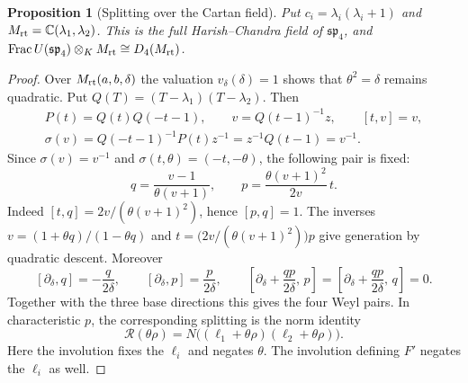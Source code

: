 \documentclass[11pt,a4paper]{article}
\newcommand{\C}{\mathbb C}
\newtheorem{proposition}[theorem]{Proposition}
\theoremstyle{definition}
\begin{document}
\begin{proposition}[Splitting over the Cartan field]\label{prop:cartansplit}
Put \(c_i=\lambda_i(\lambda_i+1)\) and \(M_{\rm rt}=\C(\lambda_1,\lambda_2)\). This is the full Harish--Chandra field of \(\mathfrak{sp}_4\), and \(\operatorname{Frac}U(\mathfrak{sp}_4)\otimes_K M_{\rm rt}\cong D_4(M_{\rm rt})\).
\end{proposition}
\begin{proof}
Over \(M_{\rm rt}(a,b,\delta)\) the valuation \(v_\delta(\delta)=1\) shows that \(\theta^2=\delta\) remains quadratic. Put \(Q(T)=(T-\lambda_1)(T-\lambda_2)\). Then
\[
 \begin{gathered}
 P(t)=Q(t)Q(-t-1),\qquad v=Q(t-1)^{-1}z,\qquad [t,v]=v,\\
 \sigma(v)=Q(-t-1)^{-1}P(t)z^{-1}=z^{-1}Q(t-1)=v^{-1}.
 \end{gathered}
\]
Since \(\sigma(v)=v^{-1}\) and \(\sigma(t,\theta)=(-t,-\theta)\), the following pair is fixed:
\[
 q=\frac{v-1}{\theta(v+1)},\qquad p=\frac{\theta(v+1)^2}{2v}\,t .
\]
Indeed \([t,q]=2v/(\theta(v+1)^2)\), hence \([p,q]=1\). The inverses \(v=(1+\theta q)/(1-\theta q)\) and \(t=\big(2v/(\theta(v+1)^2)\big)p\) give generation by quadratic descent. Moreover
\[
 [\partial_\delta,q]=-\frac{q}{2\delta},\qquad
 [\partial_\delta,p]=\frac{p}{2\delta},\qquad
 \left[\partial_\delta+\frac{qp}{2\delta},\,p\right]=\left[\partial_\delta+\frac{qp}{2\delta},\,q\right]=0.
\]
Together with the three base directions this gives the four Weyl pairs.
In characteristic \(p\), the corresponding splitting is the norm identity
\[
 \mathcal R(\theta\rho)
 =N\big((\ell_1+\theta\rho)(\ell_2+\theta\rho)\big).
\]
Here the involution fixes the \(\ell_i\) and negates \(\theta\). The involution defining \(F'\) negates the \(\ell_i\) as well.


\end{proof}
\end{document}
